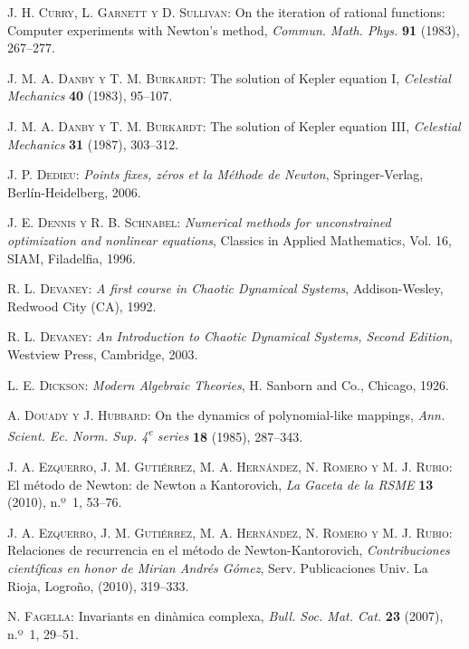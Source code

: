 \begin{thebibliography}{999}
 \textsc{J. H. Curry, L. Garnett y D. Sullivan}: 
{On the iteration of rational functions: Computer experiments with Newton's method}, 
\textit{Commun. Math. Phys.} \textbf{91} (1983), 267--277.

\textsc{J. M. A. Danby y T. M. Burkardt}: {The solution of Kepler equation I},
\textit{Celestial Mechanics} \textbf{40} (1983), 95--107.

\textsc{J. M. A. Danby y T. M. Burkardt}: {The solution of Kepler equation III},
\textit{Celestial Mechanics} \textbf{31} (1987), 303--312.

\textsc{J. P. Dedieu}:
\textit{Points fixes, zéros et la Méthode de Newton},
Springer-Verlag, Berlín-Heidelberg, 2006.

\textsc{J. E. Dennis y R. B. Schnabel}:
\textit{Numerical  methods for unconstrained optimization and nonlinear equations},
Classics in Applied Mathematics, Vol. 16, SIAM, Filadelfia, 1996.

\textsc{R. L. Devaney}:
\textit{A first course in Chaotic Dynamical Systems},
Addison-Wesley, Redwood City (CA), 1992.

\textsc{R. L. Devaney}:
\textit{An Introduction to Chaotic Dynamical Systems, Second Edition},
Westview Press, Cambridge, 2003.

\textsc{L. E. Dickson}:
\textit{Modern Algebraic Theories},
H. Sanborn and Co., Chicago, 1926.


 \textsc{A. Douady y J. Hubbard}: 
 {On the dynamics of polynomial-like mappings}, 
 \textit{Ann. Scient. Ec. Norm. Sup. 4\textsuperscript{e} series} \textbf{18} (1985), 287--343.

\textsc{J. A. Ezquerro, J. M. Gutiérrez, M. A. Hernández, N. Romero y M. J. Rubio}: 
{El método de Newton: de Newton a Kantorovich}, \textit{La Gaceta de la RSME} \textbf{13} (2010), n.º~1, 53--76.
 
\textsc{J. A. Ezquerro, J. M. Gutiérrez, M. A. Hernández, N. Romero y M. J. Rubio}: 
{Relaciones de recurrencia en el método de Newton-Kantorovich}, 
\textit{Contribuciones científicas en honor de Mirian Andrés Gómez}, 
 Serv. Publicaciones Univ. La Rioja, Logroño, (2010),  319--333.

\textsc{N. Fagella}: {Invariants en din\`amica complexa},
\textit{Bull. Soc. Mat. Cat.} \textbf{23}  (2007), n.º~1, 29--51.


\end{thebibliography}
